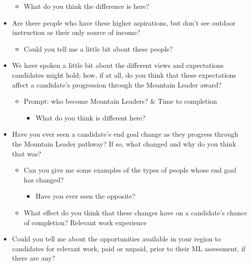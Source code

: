 \documentclass[
  12pt,
  a4paper,
]{book}
\providecommand{\tightlist}{%
  \setlength{\itemsep}{0pt}\setlength{\parskip}{0pt}}
\begin{document}
\begin{itemize}
  \begin{itemize}
  \tightlist
  \item
    What do you think the difference is here?
  \end{itemize}
\item
  Are there people who have these higher aspirations, but don't see outdoor instruction as their only source of income?

  \begin{itemize}
  \tightlist
  \item
    Could you tell me a little bit about these people?
  \end{itemize}
\item
  We have spoken a little bit about the different views and expectations candidates might hold; how, if at all, do you think that these expectations affect a candidate's progression through the Mountain Leader award?

  \begin{itemize}
  \tightlist
  \item
    Prompt: who become Mountain Leaders? \& Time to completion

    \begin{itemize}
    \tightlist
    \item
      What do you think is different here?
    \end{itemize}
  \end{itemize}
\item
  Have you ever seen a candidate's end goal change as they progress through the Mountain Leader pathway? If so, what changed and why do you think that was?

  \begin{itemize}
  \tightlist
  \item
    Can you give me some examples of the types of people whose end goal has changed?

    \begin{itemize}
    \tightlist
    \item
      Have you ever seen the opposite?
    \end{itemize}
  \item
    What effect do you think that these changes have on a candidate's chance of completion?
    Relevant work experience
  \end{itemize}
\item
  Could you tell me about the opportunities available in your region to candidates for relevant work, paid or unpaid, prior to their ML assessment, if there are any?


\end{itemize}
\end{document}
